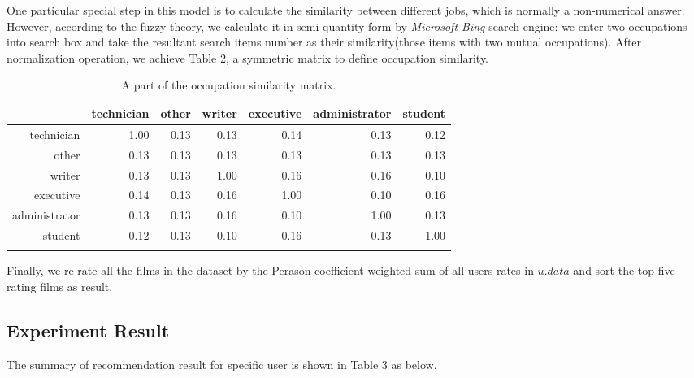One particular special step in this model is to calculate the similarity between different jobs, which is normally a non-numerical answer. However, according to the fuzzy theory, we calculate it in semi-quantity form by \textit{Microsoft Bing} search engine: we enter two occupations into search box and take the resultant search items number as their similarity(those items with two mutual occupations). After normalization operation, we achieve Table 2, a symmetric matrix to define occupation similarity.

\begin{longtable}{|r|r|r|r|r|r|r|}
\hline
           & technician &   other &  writer &  executive & administrator &  student \\
\hline
technician &      1.00  &   0.13  &    0.13  &    0.14  &    0.13  &    0.12  \\
\hline
     other &      0.13  &   0.13  &    0.13  &    0.13  &    0.13  &    0.13  \\
\hline
    writer &      0.13  &   0.13  &    1.00  &    0.16  &    0.16  &    0.10  \\
\hline
 executive &      0.14  &   0.13  &    0.16  &    1.00  &    0.10  &    0.16  \\
\hline
administrator &   0.13  &   0.13  &   0.16  &     0.10  &    1.00  &    0.13  \\
\hline
   student &      0.12  &   0.13  &   0.10  &     0.16  &    0.13  &    1.00  \\
\hline
\caption{A part of the occupation similarity matrix.}
\end{longtable}  
Finally, we re-rate all the films in the dataset by the Perason coefficient-weighted sum of all users rates in $u.data$ and sort the top five rating films as result.

\subsection{Experiment Result}
The summary of recommendation result for specific user is shown in Table 3 as below.

